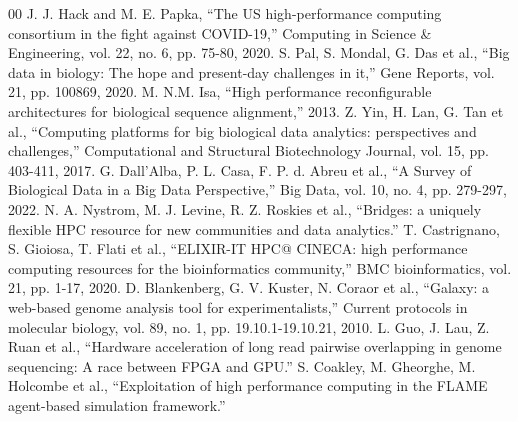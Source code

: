 \documentclass[conference]{IEEEtran}
\begin{document}
\begin{thebibliography}{00}
 J. J. Hack and M. E. Papka, “The US high-performance computing consortium in the fight against COVID-19,” Computing in Science \& Engineering, vol. 22, no. 6, pp. 75-80, 2020.
 S. Pal, S. Mondal, G. Das et al., “Big data in biology: The hope and present-day challenges in it,” Gene Reports, vol. 21, pp. 100869, 2020.
 M. N.M. Isa, “High performance reconfigurable architectures for biological sequence alignment,” 2013.
 Z. Yin, H. Lan, G. Tan et al., “Computing platforms for big biological data analytics: perspectives and challenges,” Computational and Structural Biotechnology Journal, vol. 15, pp. 403-411, 2017.
 G. Dall’Alba, P. L. Casa, F. P. d. Abreu et al., “A Survey of Biological Data in a Big Data Perspective,” Big Data, vol. 10, no. 4, pp. 279-297, 2022.
 N. A. Nystrom, M. J. Levine, R. Z. Roskies et al., “Bridges: a uniquely flexible HPC resource for new communities and data analytics.”
 T. Castrignano, S. Gioiosa, T. Flati et al., “ELIXIR-IT HPC@ CINECA: high performance computing resources for the bioinformatics community,” BMC bioinformatics, vol. 21, pp. 1-17, 2020.
 D. Blankenberg, G. V. Kuster, N. Coraor et al., “Galaxy: a web-based genome analysis tool for experimentalists,” Current protocols in molecular biology, vol. 89, no. 1, pp. 19.10.1-19.10.21, 2010.
 L. Guo, J. Lau, Z. Ruan et al., “Hardware acceleration of long read pairwise overlapping in genome sequencing: A race between FPGA and GPU.”
 S. Coakley, M. Gheorghe, M. Holcombe et al., “Exploitation of high performance computing in the FLAME agent-based simulation framework.”
\end{thebibliography}
\end{document}
